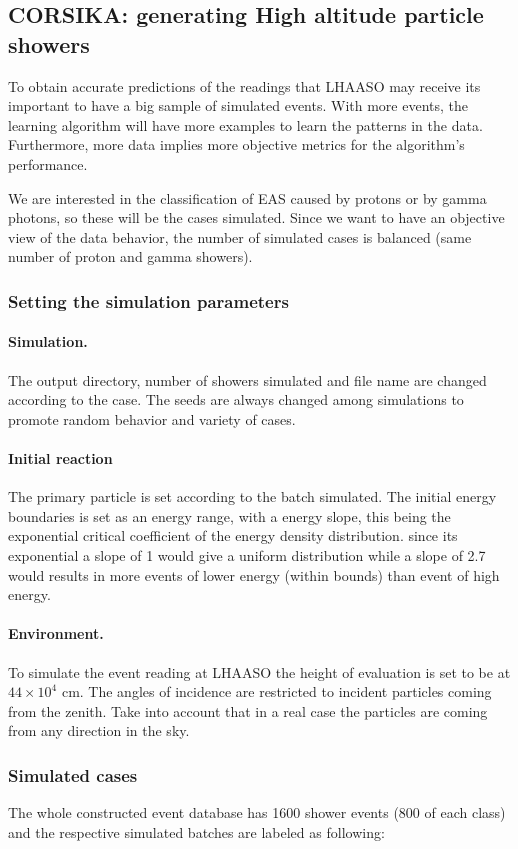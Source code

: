 \documentclass{article}
\begin{document}
\subsection{CORSIKA: generating High altitude particle showers}
To obtain accurate predictions of the readings that LHAASO may receive its important to have a big sample of simulated events. With more events, the learning algorithm will have more examples to learn the patterns in the data. Furthermore, more data implies more objective metrics for the algorithm's performance.

We are interested in the classification of EAS caused by protons or by gamma photons, so these will be the cases simulated. Since we want to have an objective view of the data behavior, the number of simulated cases is balanced (same number of proton and gamma showers).

\subsubsection{Setting the simulation parameters}

\paragraph{Simulation.}
The output directory, number of showers simulated and file name are changed according to the case. The seeds are always changed among simulations to promote random behavior and variety of cases. 
\paragraph{Initial reaction}
The primary particle is set according to the batch simulated. The initial energy boundaries is set as an energy range, with a energy slope, this being the exponential critical coefficient of the energy density distribution. since its exponential a slope of 1 would give a uniform distribution while a slope of 2.7 would results in more events of lower energy (within bounds) than event of high energy.
\paragraph{Environment.} To simulate the event reading at LHAASO the height of evaluation is set to be at $44\times 10^4$ cm. The angles of incidence are restricted to incident particles coming from the zenith. Take into account that in a real case the particles are coming from any direction in the sky.
\subsubsection{Simulated cases}
The whole constructed event database has 1600 shower events (800 of each class) and the respective simulated batches are labeled as following:
\end{document}
